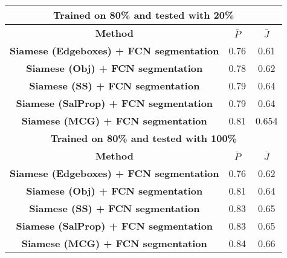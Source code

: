 \documentclass[conference]{IEEEtran}
\begin{document}
\begin{table}[]
\begin{tabular}{||c| c |c||}
\multicolumn{3}{||c||}{\textbf{Trained on 80\% and tested with 20\%}}                                                                   \\\hline
\textbf{Method} & $\bar{\textit{P}}$ & $\bar{\textit{J}}$\\\hline
\textbf{Siamese (Edgeboxes) + FCN segmentation}                                   & 0.76                             & 0.61                             \\\hline
\textbf{Siamese (Obj) + FCN segmentation}                                         & 0.78                             & 0.62                             \\\hline
\textbf{Siamese (SS) + FCN segmentation}                                          & 0.79                             & 0.64                             \\\hline
\textbf{Siamese (SalProp) + FCN segmentation}                                     & 0.79                             & 0.64                             \\\hline
\textbf{Siamese (MCG) + FCN segmentation}                                         & 0.81                             & 0.654                            \\\hline\hline
\multicolumn{3}{||c||}{\textbf{Trained on 80\% and tested with 100\%}}   \\                                                  \hline             
\textbf{Method} & $\bar{\textit{P}}$ & $\bar{\textit{J}}$\\\hline
\textbf{Siamese (Edgeboxes) + FCN segmentation}                                   & 0.76                             & 0.62                             \\\hline
\textbf{Siamese (Obj) + FCN segmentation}                                         & 0.81                             & 0.64                             \\\hline
\textbf{Siamese (SS) + FCN segmentation}                                          & 0.83                             & 0.65                             \\\hline
\textbf{Siamese (SalProp) + FCN segmentation}                                     & 0.83                             & 0.65                             \\\hline
\textbf{Siamese (MCG) + FCN segmentation}                                         & 0.84                             & 0.66                             \\\hline\hline

\end{tabular}
\end{table}
\end{document}

